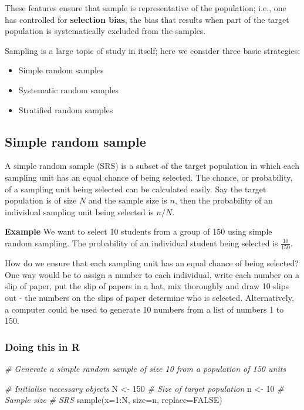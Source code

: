 \documentclass[
  oneside]{krantz}
\newenvironment{Shaded}{\begin{snugshade}}{\end{snugshade}}
\newcommand{\AttributeTok}[1]{\textcolor[rgb]{0.77,0.63,0.00}{#1}}
\newcommand{\CommentTok}[1]{\textcolor[rgb]{0.56,0.35,0.01}{\textit{#1}}}
\newcommand{\ConstantTok}[1]{\textcolor[rgb]{0.00,0.00,0.00}{#1}}
\newcommand{\DecValTok}[1]{\textcolor[rgb]{0.00,0.00,0.81}{#1}}
\newcommand{\FunctionTok}[1]{\textcolor[rgb]{0.00,0.00,0.00}{#1}}
\newcommand{\NormalTok}[1]{#1}
\newcommand{\OtherTok}[1]{\textcolor[rgb]{0.56,0.35,0.01}{#1}}
\newcommand{\SpecialCharTok}[1]{\textcolor[rgb]{0.00,0.00,0.00}{#1}}
\begin{document}
These features ensure that sample is representative of the population; i.e., one has controlled for \textbf{selection bias}, the bias that results when part of the target population is systematically excluded from the samples.

Sampling is a large topic of study in itself; here we consider three basic strategies:

\begin{itemize}
\item
  Simple random samples
\item
  Systematic random samples
\item
  Stratified random samples
\end{itemize}

\hypertarget{simple-random-sample}{%
\subsection{Simple random sample}\label{simple-random-sample}}

A simple random sample (SRS) is a subset of the target population in which each sampling unit has an equal chance of being selected. The chance, or probability, of a sampling unit being selected can be calculated easily. Say the target population is of size \(N\) and the sample size is \(n\), then the probability of an individual sampling unit being selected is \(n/N\).

\textbf{Example} We want to select 10 students from a group of 150 using simple random sampling. The probability of an individual student being selected is \(\frac{10}{150}\).

How do we ensure that each sampling unit has an equal chance of being selected? One way would be to assign a number to each individual, write each number on a slip of paper, put the slip of papers in a hat, mix thoroughly and draw 10 slips out - the numbers on the slips of paper determine who is selected. Alternatively, a computer could be used to generate 10 numbers from a list of numbers 1 to 150.

\hypertarget{doing-this-in-r}{%
\subsubsection{Doing this in R}\label{doing-this-in-r}}

\begin{Shaded}
\begin{Highlighting}[]
\CommentTok{\# Generate a simple random sample of size 10 from a population of 150 units}

\CommentTok{\# Initialise necessary objects}
\NormalTok{N }\OtherTok{\textless{}{-}} \DecValTok{150} \CommentTok{\# Size of target population}
\NormalTok{n }\OtherTok{\textless{}{-}} \DecValTok{10} \CommentTok{\# Sample size}
\CommentTok{\# SRS }
\FunctionTok{sample}\NormalTok{(}\AttributeTok{x=}\DecValTok{1}\SpecialCharTok{:}\NormalTok{N, }\AttributeTok{size=}\NormalTok{n, }\AttributeTok{replace=}\ConstantTok{FALSE}\NormalTok{)}
\end{Highlighting}
\end{Shaded}
\end{document}
